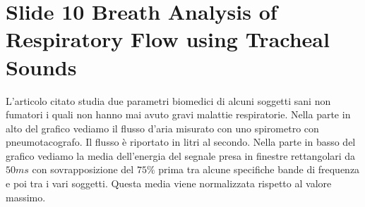 \section{Slide 10 Breath Analysis of Respiratory Flow using Tracheal Sounds}

L'articolo citato studia due parametri biomedici di alcuni soggetti sani non fumatori i quali non hanno mai avuto gravi malattie respiratorie.
Nella parte in alto del grafico vediamo il flusso d'aria misurato con uno spirometro con pneumotacografo.
Il flusso \`e riportato in litri al secondo.
Nella parte in basso del grafico vediamo la media dell'energia del segnale presa in finestre rettangolari da $50ms$ con sovrapposizione del $75\%$ prima tra alcune specifiche bande di frequenza e poi tra i vari soggetti.
Questa media viene normalizzata rispetto al valore massimo.

